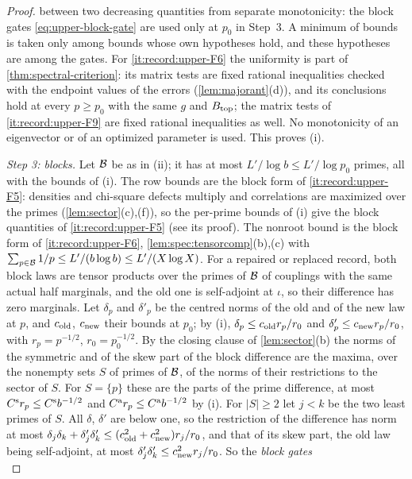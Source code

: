 \begin{proof}
between two decreasing quantities from separate monotonicity: the block gates
\eqref{eq:upper-block-gate} are used only at $p_0$ in Step~3.
A minimum of bounds is taken only among bounds whose own hypotheses
hold, and these hypotheses are among the gates. For \ref{it:record:upper-F6} the
uniformity is part of \cref{thm:spectral-criterion}: its matrix tests are fixed
rational inequalities checked with the endpoint values of the errors
(\cref{lem:majorant}(d)), and its conclusions hold at every $p\ge p_0$ with the same
$g$ and $B_{\rm top}$; the matrix tests of \ref{it:record:upper-F9} are fixed rational
inequalities as well. No monotonicity of an eigenvector or of an optimized parameter
is used. This proves (i).

\emph{Step 3: blocks.} Let $\mathcal B$ be as in (ii); it has at most
$L'/\log b\le L'/\log p_0$ primes, all with the bounds of (i). The row bounds
are the block form of \ref{it:record:upper-F5}: densities and chi-square
defects multiply and correlations are maximized over the primes
(\cref{lem:sector}(c),(f)), so the per-prime bounds of (i) give the block
quantities of \ref{it:record:upper-F5} (see its proof). The nonroot bound is the
block form of \ref{it:record:upper-F6}, \cref{lem:spec:tensorcomp}(b),(c) with
$\sum_{p\in\mathcal B}1/p\le L'/(b\log b)\le L'/(X\log X)$.
For a repaired or replaced record, both block laws are tensor products over the
primes of $\mathcal B$ of couplings with the same actual half marginals, and the old one is
self-adjoint at $\iota$, so their difference has zero marginals. Let $\delta_p$ and
$\delta'_p$ be the centred norms of the old and of the new law at $p$, and
$c_{\rm old}$, $c_{\rm new}$ their bounds at $p_0$; by (i),
$\delta_p\le c_{\rm old}r_p/r_0$ and $\delta'_p\le c_{\rm new}r_p/r_0$, with
$r_p=p^{-1/2}$, $r_0=p_0^{-1/2}$. By the closing clause of \cref{lem:sector}(b) the
norms of the symmetric and of the skew part of the block difference are the maxima,
over the nonempty sets $S$ of primes of $\mathcal B$, of the norms of their restrictions to
the sector of $S$. For $S=\{p\}$ these are the parts of the prime difference, at most
$C^{\rm s}r_p\le C^{\rm s}b^{-1/2}$ and $C^{\rm a}r_p\le C^{\rm a}b^{-1/2}$ by (i). For
$|S|\ge2$ let $j<k$ be the two least primes of $S$. All $\delta$, $\delta'$ are below
one, so the restriction of the difference has norm at most
$\delta_j\delta_k+\delta'_j\delta'_k\le(c_{\rm old}^2+c_{\rm new}^2)r_j/r_0$, and that
of its skew part, the old law being self-adjoint, at most
$\delta'_j\delta'_k\le c_{\rm new}^2r_j/r_0$. So the \emph{block gates}
\begin{equation}\label{eq:upper-block-gate}

\end{equation}
\end{proof}

